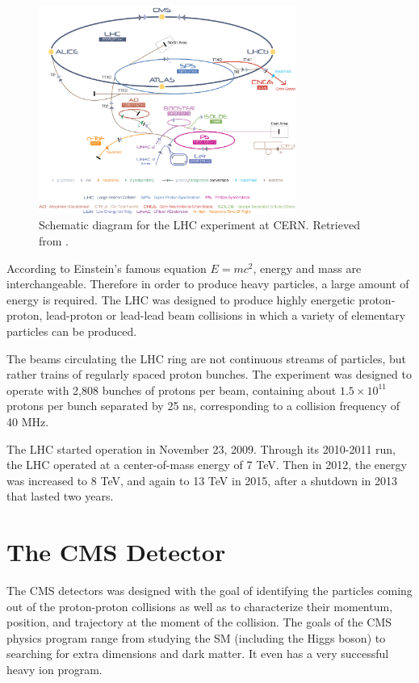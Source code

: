  \begin{figure}[H]
 	\centering
 	\includegraphics[width=0.75\textwidth]{figures/Cern-Accelerator-Complex.jpg}
 	\singlespace
 	\caption{Schematic diagram for the LHC experiment at CERN. Retrieved from \cite{LHC-schematic}.}
 	\label{fig:lhcdia}
 \end{figure}

 According to Einstein's famous equation $E=mc^{2}$, energy and mass are interchangeable. Therefore in order to produce heavy particles, a large amount of energy is required. The LHC was designed to produce highly energetic proton-proton, lead-proton or lead-lead beam collisions in which a variety of elementary particles can be produced.

 The beams circulating the LHC ring are not continuous streams of particles, but rather trains of regularly spaced proton bunches. The experiment was designed to operate with 2,808 bunches of protons per beam, containing about $1.5\times10^{11}$ protons per bunch separated by 25 ns, corresponding to a collision frequency of 40 MHz. 

The LHC started operation in November 23, 2009. Through its 2010-2011 run, the LHC operated at a center-of-mass energy of 7 TeV. Then in 2012, the energy was increased to 8 TeV, and again to 13 TeV in 2015, after a shutdown in 2013 that lasted two years.


\section{The CMS Detector}

The CMS detectors was designed with the goal of identifying the particles coming out of the proton-proton collisions as well as to characterize their momentum, position, and trajectory at the moment of the collision. The goals of the CMS physics program range from studying the SM (including the Higgs boson) to searching for extra dimensions and dark matter. It even has a very successful heavy ion program.

